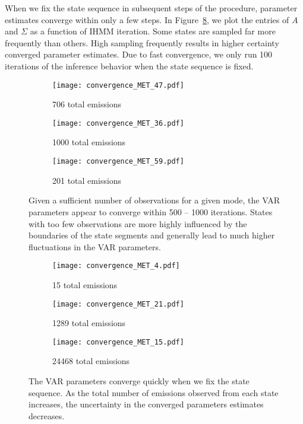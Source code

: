   When we fix the state sequence in subsequent steps of the procedure, parameter 
  estimates converge within only a few steps. In Figure~\ref{fig:fixed_state_convergence}, we 
  plot the entries of $A$ and $\Sigma$ as a function of IHMM iteration. Some states
  are sampled far more frequently than others. High sampling frequently results in
  higher certainty converged parameter estimates. Due to fast convergence, we only
  run 100 iterations of the inference behavior when the state sequence is fixed.
  
  \begin{figure}[h]
  \centering
  \begin{subfigure}{0.8\textwidth}
  \texttt{[image: convergence\_MET\_47.pdf]}
  \caption{706 total emissions}\label{fig:convergence3d_MET_low}
  \end{subfigure}
  \begin{subfigure}{0.8\textwidth}
  \texttt{[image: convergence\_MET\_36.pdf]}
  \caption{1000 total emissions}\label{fig:convergence3d_MET_medium}
  \end{subfigure}
  \begin{subfigure}{0.8\textwidth}
  \texttt{[image: convergence\_MET\_59.pdf]}
  \caption{201 total emissions}\label{fig:convergence3d_MET_high}
  \end{subfigure}
  \caption{Given a sufficient number of observations for a given mode, the VAR parameters
  appear to converge within 500 -- 1000 iterations. States with too few observations
  are more highly influenced by the boundaries of the state segments and generally
  lead to much higher fluctuations in the VAR parameters.}\label{fig:convergence3d}
  \end{figure}
  
  \begin{figure}[h]
  \centering
  \begin{subfigure}{0.6\textwidth}
  \texttt{[image: convergence\_MET\_4.pdf]}
  \caption{15 total emissions}\label{fig:convergence_MET_low}
  \end{subfigure}
  \begin{subfigure}{0.6\textwidth}
  \texttt{[image: convergence\_MET\_21.pdf]}
  \caption{1289 total emissions}\label{fig:convergence_MET_medium}
  \end{subfigure}
  \begin{subfigure}{0.6\textwidth}
  \texttt{[image: convergence\_MET\_15.pdf]}
  \caption{24468 total emissions}\label{fig:convergence_MET_high}
  \end{subfigure}
  \caption{The VAR parameters converge quickly when we fix the state
  sequence. As the total number of emissions observed from each state
  increases, the uncertainty in the converged parameters estimates
  decreases.}\label{fig:fixed_state_convergence}
  \end{figure}
  
